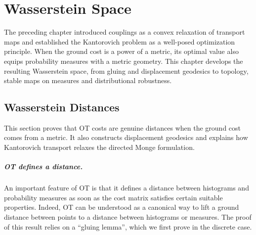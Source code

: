 
\chapter{Wasserstein Space}
\label{sec-wasserstein-space}

The preceding chapter introduced couplings as a convex relaxation of transport maps and established the Kantorovich problem as a well-posed optimization principle. When the ground cost is a power of a metric, its optimal value also equips probability measures with a metric geometry. This chapter develops the resulting Wasserstein space, from gluing and displacement geodesics to topology, stable maps on measures and distributional robustness.

\section{Wasserstein Distances}
\label{sec-wasserstein-distances}


This section proves that OT costs are genuine distances when the ground cost comes from a metric. It also constructs displacement geodesics and explains how Kantorovich transport relaxes the directed Monge formulation.

\paragraph{OT defines a distance.}


An important feature of OT is that it defines a distance between histograms and probability measures as soon as the cost matrix satisfies certain suitable properties. Indeed, OT can be understood as a canonical way to lift a ground distance between points to a distance between histograms or measures.
%
The proof of this result relies on a ``gluing lemma'', which we first prove in the discrete case.

